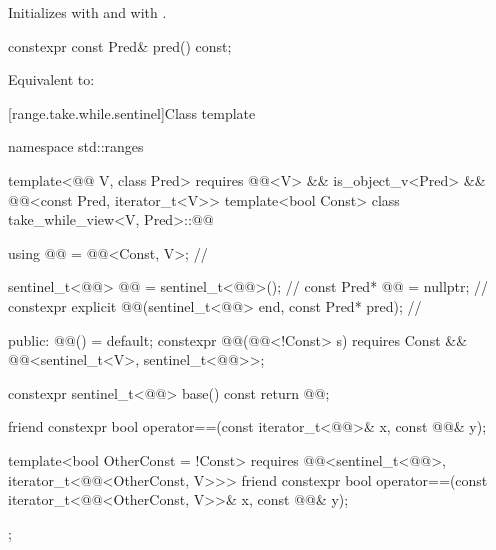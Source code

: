 \begin{itemdescr}
\pnum
\effects
Initializes  with  and
 with .
\end{itemdescr}

%
\begin{itemdecl}
constexpr const Pred& pred() const;
\end{itemdecl}

\begin{itemdescr}
\pnum
\effects
Equivalent to: 
\end{itemdescr}

[range.take.while.sentinel]{Class template }

%
\begin{codeblock}
namespace std::ranges {
  template<@@ V, class Pred>
    requires @@<V> && is_object_v<Pred> &&
             @@<const Pred, iterator_t<V>>
  template<bool Const>
  class take_while_view<V, Pred>::@@ {
    using @@ = @@<Const, V>;                                        // \expos

    sentinel_t<@@> @@ = sentinel_t<@@>();                                 // \expos
    const Pred* @@ = nullptr;                                                // \expos
    constexpr explicit @@(sentinel_t<@@> end, const Pred* pred);       // \expos

  public:
    @@() = default;
    constexpr @@(@@<!Const> s)
      requires Const && @@<sentinel_t<V>, sentinel_t<@@>>;

    constexpr sentinel_t<@@> base() const { return @@; }

    friend constexpr bool operator==(const iterator_t<@@>& x, const @@& y);

    template<bool OtherConst = !Const>
      requires @@<sentinel_t<@@>, iterator_t<@@<OtherConst, V>>>
    friend constexpr bool operator==(const iterator_t<@@<OtherConst, V>>& x,
                                     const @@& y);
  };
}
\end{codeblock}

